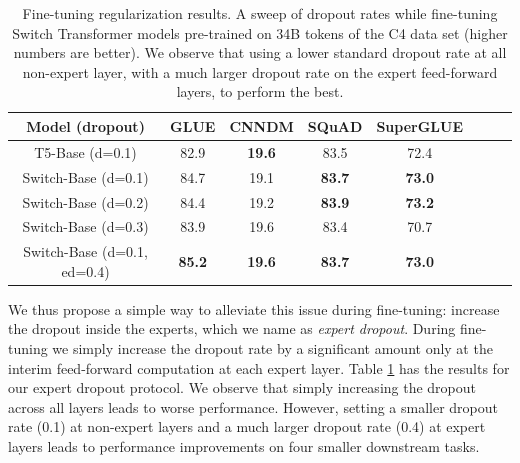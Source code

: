 \documentclass[twoside,11pt]{article}
\begin{document}
\begin{table}[h!]
\begin{center}
\begin{tabular}{cccccccc}
    \toprule
    {Model (dropout)} & {GLUE} & {CNNDM} & {SQuAD} & {SuperGLUE}\\ \hline
    T5-Base (d=0.1) & 82.9 & \textbf{19.6} & 83.5  & 72.4\\
    Switch-Base (d=0.1) & 84.7 & 19.1 & \textbf{83.7} & \textbf{73.0}\\
    Switch-Base (d=0.2) & 84.4 & 19.2 & \textbf{83.9} & \textbf{73.2}\\
    Switch-Base (d=0.3) & 83.9 & 19.6 & 83.4 & 70.7 \\
    Switch-Base (d=0.1, ed=0.4) & \textbf{85.2} & \textbf{19.6} & \textbf{83.7} & \textbf{73.0} \\
    \bottomrule
\end{tabular}
\caption{Fine-tuning regularization results. A sweep of dropout rates while fine-tuning Switch Transformer models pre-trained on 34B tokens of the C4 data set (higher numbers are better). We observe that using a lower standard dropout rate at all non-expert layer, with a much larger dropout rate on the expert feed-forward layers, to perform the best.}
\label{tab:expert_dropout}
\end{center}
\end{table}

We thus propose a simple way to alleviate this issue during fine-tuning: increase the dropout inside the experts, which we name as \emph{expert dropout}.
During fine-tuning we simply increase the dropout rate by a significant amount only at the interim feed-forward computation at each expert layer.
Table \ref{tab:expert_dropout} has the results for our expert dropout protocol.
We observe that simply increasing the dropout across all layers leads to worse performance.
However, setting a smaller dropout rate (0.1) at non-expert layers and a much larger dropout rate (0.4) at expert layers leads to performance improvements on four smaller downstream tasks.
\end{document}
